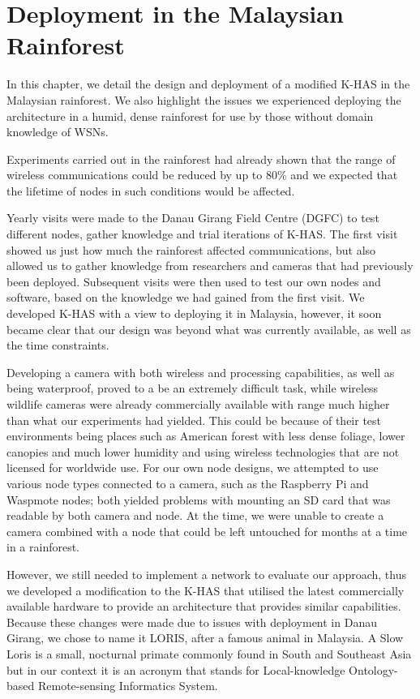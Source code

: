\chapter{Deployment in the Malaysian Rainforest}
	In this chapter, we detail the design and deployment of a modified K-HAS in the Malaysian rainforest. We also highlight the issues we experienced deploying the architecture in a humid, dense rainforest for use by those without domain knowledge of WSNs.
	
	Experiments carried out in the rainforest had already shown that the range of wireless communications could be reduced by up to 80\% and we expected that the lifetime of nodes in such conditions would be affected.
	
	Yearly visits were made to the Danau Girang Field Centre (DGFC) to test different nodes, gather knowledge and trial iterations of K-HAS. The first visit showed us just how much the rainforest affected communications, but also allowed us to gather knowledge from researchers and cameras that had previously been deployed. Subsequent visits were then used to test our own nodes and software, based on the knowledge we had gained from the first visit. We developed K-HAS with a view to deploying it in Malaysia, however, it soon became clear that our design was  beyond what was currently available, as well as the time constraints.
	
	Developing a camera with both wireless and processing capabilities, as well as being waterproof, proved to a be an extremely difficult task, while wireless wildlife cameras were already commercially available with range much higher than what our experiments had yielded. This could be because of their test environments being places such as American forest with less dense foliage, lower canopies and much lower humidity and using wireless technologies that are not licensed for worldwide use. For our own node designs, we attempted to use various node types connected to a camera, such as the Raspberry Pi and Waspmote nodes; both yielded problems with mounting an SD card that was readable by both camera and node. At the time, we were unable to create a camera combined with a node that could be left untouched for months at a time in a rainforest.
	
	However, we still needed to implement a network to evaluate our approach, thus we developed a modification to the K-HAS that utilised the latest commercially available hardware to provide an architecture that provides similar capabilities. Because these changes were made due to issues with deployment in Danau Girang, we chose to name it LORIS, after a famous animal in Malaysia. A Slow Loris is a small, nocturnal primate commonly found in South and Southeast Asia but in our context it is an acronym that stands for Local-knowledge Ontology-based Remote-sensing Informatics System.
	
